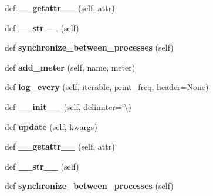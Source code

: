 \begin{DoxyCompactItemize}
\item 
\mbox{\label{classutils_1_1MetricLogger_ac83dc82a4b7c2f4078fdbbc7d75ed18b}} 
def {\bfseries \+\_\+\+\_\+getattr\+\_\+\+\_\+} (self, attr)
\item 
\mbox{\label{classutils_1_1MetricLogger_a7dbbefdb1b1e47db288d2c3384af11fe}} 
def {\bfseries \+\_\+\+\_\+str\+\_\+\+\_\+} (self)
\item 
\mbox{\label{classutils_1_1MetricLogger_aceb85ddf415836087996c28d6ed54456}} 
def {\bfseries synchronize\+\_\+between\+\_\+processes} (self)
\item 
\mbox{\label{classutils_1_1MetricLogger_a7ca17a885a17883f5301ee3bbe1682f6}} 
def {\bfseries add\+\_\+meter} (self, name, meter)
\item 
\mbox{\label{classutils_1_1MetricLogger_a52307f8e0e7d7036cec2034cb19dcbea}} 
def {\bfseries log\+\_\+every} (self, iterable, print\+\_\+freq, header=None)
\item 
\mbox{\label{classutils_1_1MetricLogger_a59c07b109de104bdab791643a7b3619b}} 
def {\bfseries \+\_\+\+\_\+init\+\_\+\+\_\+} (self, delimiter=\char`\"{}\textbackslash{})
\item 
\mbox{\label{classutils_1_1MetricLogger_a7ff577d15013ac9ad358428fd7e6ac77}} 
def {\bfseries update} (self, kwargs)
\item 
\mbox{\label{classutils_1_1MetricLogger_ac83dc82a4b7c2f4078fdbbc7d75ed18b}} 
def {\bfseries \+\_\+\+\_\+getattr\+\_\+\+\_\+} (self, attr)
\item 
\mbox{\label{classutils_1_1MetricLogger_a7dbbefdb1b1e47db288d2c3384af11fe}} 
def {\bfseries \+\_\+\+\_\+str\+\_\+\+\_\+} (self)
\item 
\mbox{\label{classutils_1_1MetricLogger_aceb85ddf415836087996c28d6ed54456}} 
def {\bfseries synchronize\+\_\+between\+\_\+processes} (self)
\item 

\end{DoxyCompactItemize}
